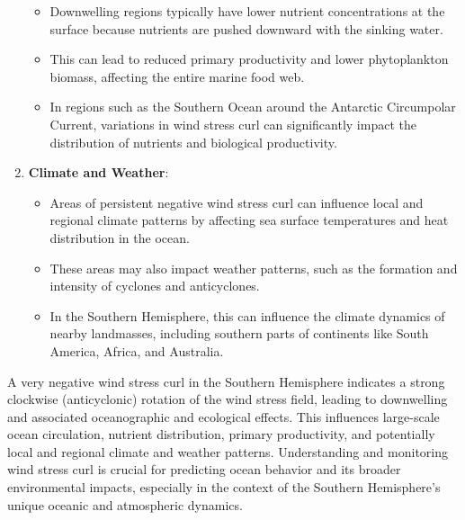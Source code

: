 \documentclass[
  letterpaper,
  DIV=11,
  numbers=noendperiod]{scrartcl}
\providecommand{\tightlist}{%
  \setlength{\itemsep}{0pt}\setlength{\parskip}{0pt}}\usepackage{longtable,booktabs,array}
\begin{document}
\begin{enumerate}
  \begin{itemize}
  \tightlist
  \item
    Downwelling regions typically have lower nutrient concentrations at
    the surface because nutrients are pushed downward with the sinking
    water.
  \item
    This can lead to reduced primary productivity and lower
    phytoplankton biomass, affecting the entire marine food web.
  \item
    In regions such as the Southern Ocean around the Antarctic
    Circumpolar Current, variations in wind stress curl can
    significantly impact the distribution of nutrients and biological
    productivity.
  \end{itemize}
\item
  \textbf{Climate and Weather}:

  \begin{itemize}
  \tightlist
  \item
    Areas of persistent negative wind stress curl can influence local
    and regional climate patterns by affecting sea surface temperatures
    and heat distribution in the ocean.
  \item
    These areas may also impact weather patterns, such as the formation
    and intensity of cyclones and anticyclones.
  \item
    In the Southern Hemisphere, this can influence the climate dynamics
    of nearby landmasses, including southern parts of continents like
    South America, Africa, and Australia.
  \end{itemize}
\end{enumerate}

A very negative wind stress curl in the Southern Hemisphere indicates a
strong clockwise (anticyclonic) rotation of the wind stress field,
leading to downwelling and associated oceanographic and ecological
effects. This influences large-scale ocean circulation, nutrient
distribution, primary productivity, and potentially local and regional
climate and weather patterns. Understanding and monitoring wind stress
curl is crucial for predicting ocean behavior and its broader
environmental impacts, especially in the context of the Southern
Hemisphere's unique oceanic and atmospheric dynamics.
\end{document}
